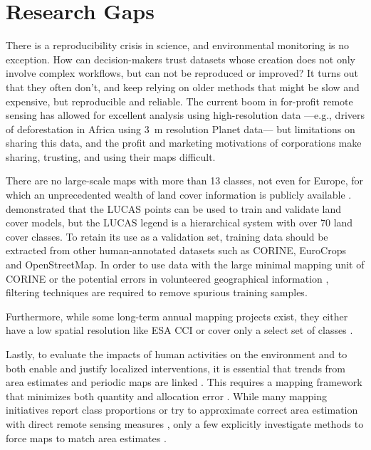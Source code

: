 \section{Research Gaps}

    There is a reproducibility crisis in science, and environmental monitoring is no exception. How can decision-makers trust datasets whose creation does not only involve complex workflows, but can not be reproduced or improved? It turns out that they often don't, and keep relying on older methods that might be slow and expensive, but reproducible and reliable. The current boom in for-profit remote sensing has allowed for excellent analysis using high-resolution data ---e.g., drivers of deforestation in Africa \citep{masolele2024mapping} using 3~m resolution Planet data--- but limitations on sharing this data, and the profit and marketing motivations of corporations make sharing, trusting, and using their maps difficult.

    There are no large-scale maps with more than 13 classes, not even for Europe, for which an unprecedented wealth of land cover information is publicly available \citep{dandrimont2020harmonised}. \citet{pflugmacher2019mapping} demonstrated that the LUCAS points can be used to train and validate land cover models, but the LUCAS legend is a hierarchical system with over 70 land cover classes. To retain its use as a validation set, training data should be extracted from other human-annotated datasets such as CORINE, EuroCrops \citep{schneider2023eurocrops} and OpenStreetMap. In order to use data with the large minimal mapping unit of CORINE or the potential errors in volunteered geographical information \citep{neis2014recent}, filtering techniques are required to remove spurious training samples.

    Furthermore, while some long-term annual mapping projects exist, they either have a low spatial resolution like ESA CCI \citep{harper202229} or cover only a select set of classes \citep{hansen2022global}.

    Lastly, to evaluate the impacts of human activities on the environment and to both enable and justify localized interventions, it is essential that trends from area estimates and periodic maps are linked \citep{olofsson2014good,szantoi2020addressing,winkler2021global}. This requires a mapping framework that minimizes both quantity and allocation error \citep{pontius2011death}. While many mapping initiatives report class proportions \citep{pflugmacher2019mapping} or try to approximate correct area estimation with direct remote sensing measures \citep{kleinewillinghofer2022unbiased}, only a few explicitly investigate methods to force maps to match area estimates \citep{strahler1980use,horvath2021comparison}.
    

